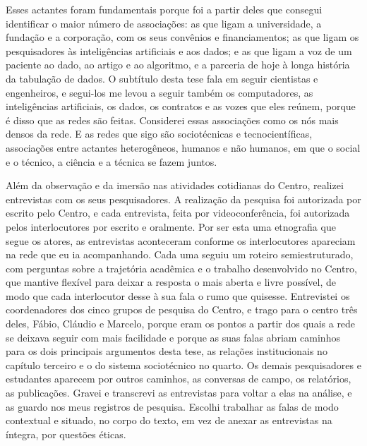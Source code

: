 Esses actantes foram fundamentais porque foi a partir deles que consegui identificar o maior número de associações: as que ligam a universidade, a fundação e a corporação, com os seus convênios e financiamentos; as que ligam os pesquisadores às inteligências artificiais e aos dados; e as que ligam a voz de um paciente ao dado, ao artigo e ao algoritmo, e a parceria de hoje à longa história da tabulação de dados. O subtítulo desta tese fala em seguir cientistas e engenheiros, e segui-los me levou a seguir também os computadores, as inteligências artificiais, os dados, os contratos e as vozes que eles reúnem, porque é disso que as redes são feitas. Considerei essas associações como os nós mais densos da rede. E as redes que sigo são sociotécnicas e tecnocientíficas, associações entre actantes heterogêneos, humanos e não humanos, em que o social e o técnico, a ciência e a técnica se fazem juntos.

Além da observação e da imersão nas atividades cotidianas do Centro, realizei entrevistas com os seus pesquisadores. A realização da pesquisa foi autorizada por escrito pelo Centro, e cada entrevista, feita por videoconferência, foi autorizada pelos interlocutores por escrito e oralmente. Por ser esta uma etnografia que segue os atores, as entrevistas aconteceram conforme os interlocutores apareciam na rede que eu ia acompanhando. Cada uma seguiu um roteiro semiestruturado, com perguntas sobre a trajetória acadêmica e o trabalho desenvolvido no Centro, que mantive flexível para deixar a resposta o mais aberta e livre possível, de modo que cada interlocutor desse à sua fala o rumo que quisesse. Entrevistei os coordenadores dos cinco grupos de pesquisa do Centro, e trago para o centro três deles, Fábio, Cláudio e Marcelo, porque eram os pontos a partir dos quais a rede se deixava seguir com mais facilidade e porque as suas falas abriam  caminhos para os dois principais argumentos desta tese, as relações institucionais no capítulo terceiro e o do sistema sociotécnico no quarto. Os demais pesquisadores e estudantes aparecem por outros caminhos, as conversas de campo, os relatórios, as publicações. Gravei e transcrevi as entrevistas para voltar a elas na análise, e as guardo nos meus registros de pesquisa. Escolhi trabalhar as falas de modo contextual e situado, no corpo do texto, em vez de anexar as entrevistas na íntegra, por questões éticas. 

